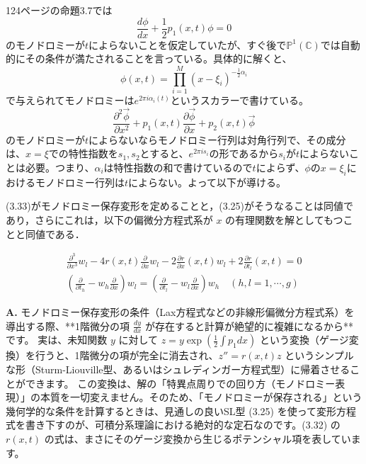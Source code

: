 124ページの命題3.7では
\[
\frac{d\phi}{dx}+\frac{1}{2}p_{1}(x,t)\phi=0
\]
のモノドロミーが$t$によらないことを仮定していたが、すぐ後で$\mathbb{P}^{1}(\mathbb{C})$では自動的にその条件が満たされることを言っている。具体的に解くと、
\[
\phi(x,t)=\prod_{i=1}^{M}(x-\xi_{i})^{-\frac{1}{2}\alpha_{i}}
\]
で与えられてモノドロミーは$e^{2\pi i\alpha_{i}(t)}$というスカラーで書けている。
\[
\frac{\partial^{2}\vec{\phi}}{\partial x^{2}} + p_{1}(x,t)\frac{\partial\vec{\phi}}{\partial x}+p_{2}(x,t)\vec{\phi}
\]
のモノドロミーが$t$によらないならモノドロミー行列は対角行列で、その成分は、$x=\xi$での特性指数を$s_{1},s_{2}$とすると、$e^{2\pi is_{i}}$の形であるから$s_{i}$が$t$によらないことは必要。つまり、$\alpha_{i}$は特性指数の和で書けているので$t$によらず、$\phi$の$x=\xi_{i}$におけるモノドロミー行列は$t$によらない。よって以下が導ける。

\begin{story}

\begin{lemma}[3.5]
(3.33)がモノドロミー保存変形を定めることと，(3.25)がそうなることは同値であり，さらにこれは，以下の偏微分方程式系が $x$ の有理関数を解としてもつことと同値である．

\begin{align}
    \frac{\partial^3}{\partial x^3}w_l - 4r(x,t)\frac{\partial}{\partial x}w_l - 2\frac{\partial r}{\partial x}(x,t)w_l + 2\frac{\partial r}{\partial t_l}(x,t) = 0 \label{eq:3.82} \\
    \left( \frac{\partial}{\partial t_h} - w_h \frac{\partial}{\partial x} \right) w_l = \left( \frac{\partial}{\partial t_l} - w_l \frac{\partial}{\partial x} \right) w_h \quad (h,l = 1,\cdots,g) \label{eq:3.83}
\end{align}

\end{lemma}
\end{story}

\begin{Q}
\textbf{A.} モノドロミー保存変形の条件（Lax方程式などの非線形偏微分方程式系）を導出する際、**1階微分の項 $\frac{dy}{dx}$ が存在すると計算が絶望的に複雑になるから**です。
実は、未知関数 $y$ に対して $z = y \exp(\frac{1}{2}\int p_1 dx)$ という変換（ゲージ変換）を行うと、1階微分の項が完全に消去され、$z'' = r(x,t)z$ というシンプルな形（Sturm-Liouville型、あるいはシュレディンガー方程式型）に帰着させることができます。
この変換は、解の「特異点周りでの回り方（モノドロミー表現）」の本質を一切変えません。そのため、「モノドロミーが保存される」という幾何学的な条件を計算するときは、見通しの良いSL型 (3.25) を使って変形方程式を書き下すのが、可積分系理論における絶対的な定石なのです。(3.32) の $r(x,t)$ の式は、まさにそのゲージ変換から生じるポテンシャル項を表しています。
\end{Q}

